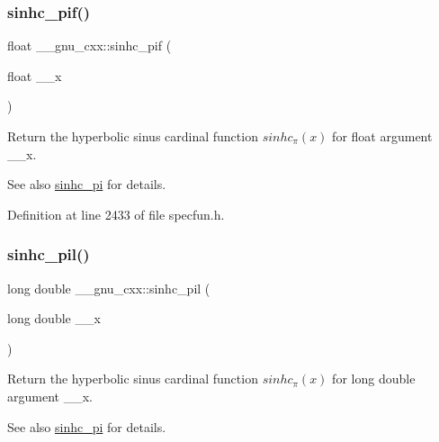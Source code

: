 \subsubsection{\texorpdfstring{sinhc\+\_\+pif()}{sinhc\_pif()}}
{\footnotesize\ttfamily float \+\_\+\+\_\+gnu\+\_\+cxx\+::sinhc\+\_\+pif (\begin{DoxyParamCaption}\item[{float}]{\+\_\+\+\_\+x }\end{DoxyParamCaption})\hspace{0.3cm}{\ttfamily [inline]}}

Return the hyperbolic sinus cardinal function $ sinhc_\pi(x) $ for {\ttfamily float} argument {\ttfamily \+\_\+\+\_\+x}.

\begin{DoxySeeAlso}{See also}
\hyperlink{group__gnu__math__spec__func_ga8bb6034e28d48879845bf64818cc06e1}{sinhc\+\_\+pi} for details. 
\end{DoxySeeAlso}


Definition at line 2433 of file specfun.\+h.

\mbox{\label{group__gnu__math__spec__func_gaa572bf7633f457c86cef65bfd6ec4ad9}} 
\subsubsection{\texorpdfstring{sinhc\+\_\+pil()}{sinhc\_pil()}}
{\footnotesize\ttfamily long double \+\_\+\+\_\+gnu\+\_\+cxx\+::sinhc\+\_\+pil (\begin{DoxyParamCaption}\item[{long double}]{\+\_\+\+\_\+x }\end{DoxyParamCaption})\hspace{0.3cm}{\ttfamily [inline]}}

Return the hyperbolic sinus cardinal function $ sinhc_\pi(x) $ for {\ttfamily long double} argument {\ttfamily \+\_\+\+\_\+x}.

\begin{DoxySeeAlso}{See also}
\hyperlink{group__gnu__math__spec__func_ga8bb6034e28d48879845bf64818cc06e1}{sinhc\+\_\+pi} for details. 
\end{DoxySeeAlso}



